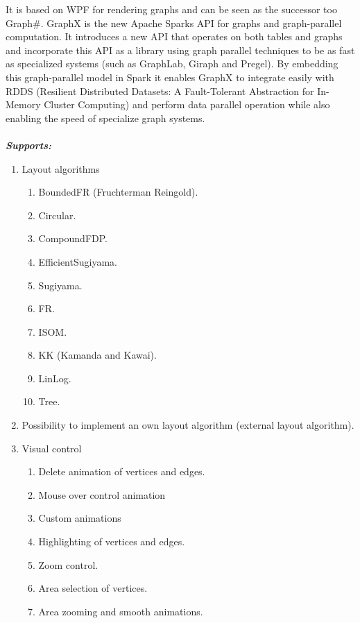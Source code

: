 \documentclass[a4paper,11pt]{kth-mag}
\begin{document}
\begin{appendices}
It is based on WPF for rendering graphs and can be seen as the successor too Graph\#. GraphX is the new Apache Sparks API for graphs and 
graph-parallel computation. It introduces a new API that operates on both tables and graphs and incorporate this API as a library using graph parallel techniques 
to be as fast as specialized systems (such as GraphLab, Giraph and Pregel). By embedding this graph-parallel model in Spark it enables GraphX to integrate easily with RDDS
(Resilient Distributed Datasets: A Fault-Tolerant Abstraction for In-Memory Cluster Computing) and perform data parallel operation while also enabling the speed of specialize graph systems\cite{website:graphxPG}.\\
\\
\textbf{\textit{Supports:\cite{website:graphx}}}\
\
\newline
\
\begin{enumerate}
	\item{Layout algorithms}
	\begin{enumerate}[label*=\arabic*.]
		\item{BoundedFR (Fruchterman Reingold).}
		\item{Circular.}
		\item{CompoundFDP.}
		\item{EfficientSugiyama.}
		\item{Sugiyama.}
		\item{FR.}
		\item{ISOM.}
		\item{KK (Kamanda and Kawai).}
		\item{LinLog.}
		\item{Tree.}
	\end{enumerate}
	\item{Possibility to implement an own layout algorithm (external layout algorithm).}
	\item{Visual control}
	\begin{enumerate}[label*=\arabic*.]
		\item{Delete animation of vertices and edges.}
		\item{Mouse over control animation}
		\item{Custom animations}
		\item{Highlighting of vertices and edges.}
		\item{Zoom control.}
		\item{Area selection of vertices.}
		\item{Area zooming and smooth animations.}
	\end{enumerate}

\end{enumerate}
\end{appendices}
\end{document}

